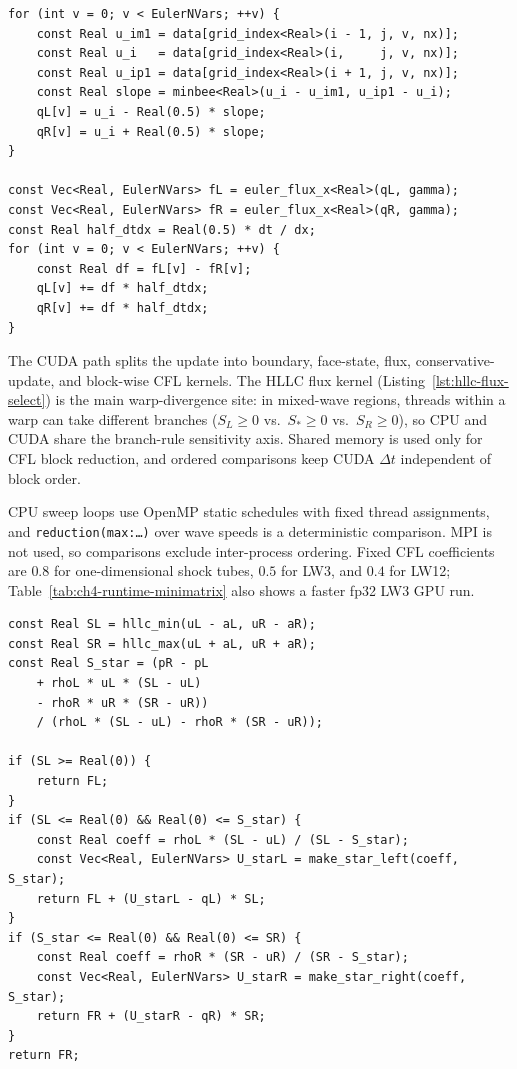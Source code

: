 \begin{lstlisting}[style=fpListing,
  caption={MUSCL--Hancock face-state construction, matching the per-cell helper used by the CPU and CUDA paths.},
  label=lst:muscl-hancock]
for (int v = 0; v < EulerNVars; ++v) {
    const Real u_im1 = data[grid_index<Real>(i - 1, j, v, nx)];
    const Real u_i   = data[grid_index<Real>(i,     j, v, nx)];
    const Real u_ip1 = data[grid_index<Real>(i + 1, j, v, nx)];
    const Real slope = minbee<Real>(u_i - u_im1, u_ip1 - u_i);
    qL[v] = u_i - Real(0.5) * slope;
    qR[v] = u_i + Real(0.5) * slope;
}

const Vec<Real, EulerNVars> fL = euler_flux_x<Real>(qL, gamma);
const Vec<Real, EulerNVars> fR = euler_flux_x<Real>(qR, gamma);
const Real half_dtdx = Real(0.5) * dt / dx;
for (int v = 0; v < EulerNVars; ++v) {
    const Real df = fL[v] - fR[v];
    qL[v] += df * half_dtdx;
    qR[v] += df * half_dtdx;
}
\end{lstlisting}

{\sloppy
The CUDA path splits the update into boundary, face-state, flux, conservative-update, and block-wise CFL kernels. The HLLC flux kernel (Listing~\ref{lst:hllc-flux-select}) is the main warp-divergence site: in mixed-wave regions, threads within a warp can take different branches ($S_L \ge 0$ vs.\ $S_\ast \ge 0$ vs.\ $S_R \ge 0$), so CPU and CUDA share the branch-rule sensitivity axis. Shared memory is used only for CFL block reduction, and ordered comparisons keep CUDA \(\Delta t\) independent of block order.\par}

CPU sweep loops use OpenMP static schedules with fixed thread assignments, and \texttt{reduction(max:\dots)} over wave speeds is a deterministic comparison. MPI is not used, so comparisons exclude inter-process ordering. Fixed CFL coefficients are $0.8$ for one-dimensional shock tubes, $0.5$ for LW3, and $0.4$ for LW12; Table~\ref{tab:ch4-runtime-minimatrix} also shows a faster fp32 LW3 GPU run.
\begin{lstlisting}[style=fpListing,
  caption={HLLC interface flux selection. The baseline build uses inclusive star-region tests; the strict-inequality variant changes only those comparator boundaries.},
  label=lst:hllc-flux-select]
const Real SL = hllc_min(uL - aL, uR - aR);
const Real SR = hllc_max(uL + aL, uR + aR);
const Real S_star = (pR - pL
    + rhoL * uL * (SL - uL)
    - rhoR * uR * (SR - uR))
    / (rhoL * (SL - uL) - rhoR * (SR - uR));

if (SL >= Real(0)) {
    return FL;
}
if (SL <= Real(0) && Real(0) <= S_star) {
    const Real coeff = rhoL * (SL - uL) / (SL - S_star);
    const Vec<Real, EulerNVars> U_starL = make_star_left(coeff, S_star);
    return FL + (U_starL - qL) * SL;
}
if (S_star <= Real(0) && Real(0) <= SR) {
    const Real coeff = rhoR * (SR - uR) / (SR - S_star);
    const Vec<Real, EulerNVars> U_starR = make_star_right(coeff, S_star);
    return FR + (U_starR - qR) * SR;
}
return FR;
\end{lstlisting}

